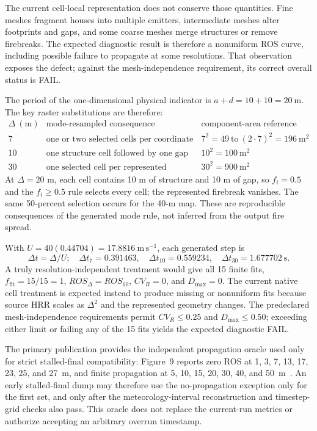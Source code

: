The current cell-local representation does not conserve those quantities. Fine
meshes fragment houses into multiple emitters, intermediate meshes alter
footprints and gaps, and some coarse meshes merge structures or remove
firebreaks. The expected diagnostic result is therefore a nonuniform ROS curve,
including possible failure to propagate at some resolutions. That observation
exposes the defect; against the mesh-independence requirement, its correct
overall status is FAIL.

The period of the one-dimensional physical indicator is
\(a+d=10+10=20~\mathrm{m}\).  The key raster substitutions are therefore:
\[
\begin{array}{c|c|c}
\Delta~(\mathrm{m})&\text{mode-resampled consequence}&
\text{component-area reference}\\\hline
7&\text{one or two selected cells per coordinate}&
7^2=49\ \text{to}\ (2\cdot7)^2=196~\mathrm{m^2}\\
10&\text{one structure cell followed by one gap cell}&
10^2=100~\mathrm{m^2}\\
30&\text{one selected cell per represented structure}&
30^2=900~\mathrm{m^2}
\end{array}
\]
At \(\Delta=20\) m, each cell contains 10 m of structure and 10 m of gap, so
\(f_i=0.5\) and the \(f_i\geq0.5\) rule selects every cell; the represented
firebreak vanishes.  The same 50-percent selection occurs for the 40-m map.
These are reproducible consequences of the generated mode rule, not inferred
from the output fire spread.

With \(U=40(0.44704)=17.8816~\mathrm{m\,s^{-1}}\), each generated step is
\[
 \Delta t=\Delta/U;
 \quad \Delta t_7=0.391463,\quad
 \Delta t_{10}=0.559234,\quad
 \Delta t_{30}=1.677702~\mathrm{s}.
\]
A truly resolution-independent treatment would give all 15 finite fits,
\(f_{\mathrm{fit}}=15/15=1\),
\(ROS_\Delta=ROS_{10}\), \(CV_R=0\), and \(D_{\max}=0\).
The current native cell treatment is expected instead to produce missing or
nonuniform fits because source HRR scales as \(\Delta^2\) and the represented
geometry changes.  The predeclared mesh-independence requirements permit
\(CV_R\leq0.25\) and \(D_{\max}\leq0.50\); exceeding either limit or failing
any of the 15 fits yields the expected diagnostic FAIL.

The primary publication provides the independent propagation oracle used only
for strict stalled-final compatibility: Figure~9 reports zero ROS at 1, 3, 7,
13, 17, 23, 25, and 27~m, and finite propagation at 5, 10, 15, 20, 30, 40,
and 50~m~\cite{QinEtAl2026}.  An early stalled-final dump may therefore use
the no-propagation exception only for the first set, and only after the
meteorology-interval reconstruction and timestep-grid checks also pass.  This
oracle does not replace the current-run metrics or authorize accepting an
arbitrary overrun timestamp.

